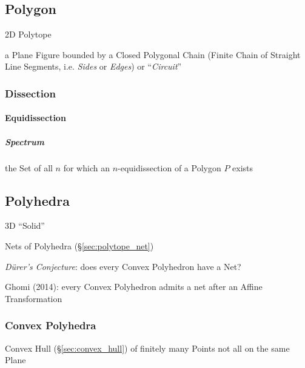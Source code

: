 \subsection{Polygon}\label{sec:polygon}

2D Polytope

a Plane Figure bounded by a Closed Polygonal Chain (Finite Chain of Straight
Line Segments, i.e. \emph{Sides} or \emph{Edges}) or ``\emph{Circuit}''



\subsubsection{Dissection}\label{sec:dissection}

\paragraph{Equidissection}\label{sec:equidissection}\hfill

\subparagraph{Spectrum}\label{sec:polygon_spectrum}\hfill

the Set of all $n$ for which an $n$-equidissection of a Polygon $P$ exists



\subsection{Polyhedra}\label{sec:polyhedra}

3D ``Solid''

Nets of Polyhedra (\S\ref{sec:polytope_net})

\emph{D\"urer's Conjecture}: does every Convex Polyhedron have a Net?

Ghomi (2014): every Convex Polyhedron admits a net after an Affine
Transformation



\subsubsection{Convex Polyhedra}\label{sec:convex_polyhedra}

Convex Hull (\S\ref{sec:convex_hull}) of finitely many Points not all on the
same Plane

